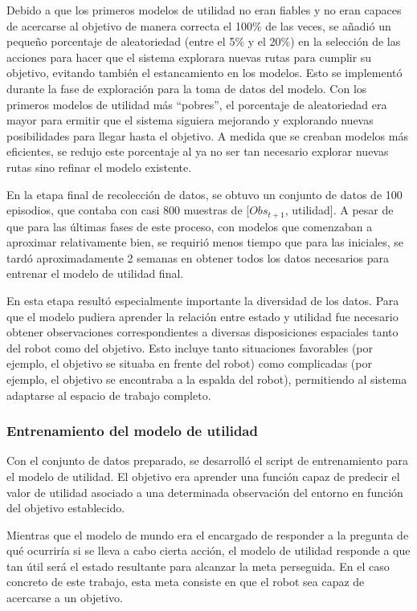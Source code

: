 Debido a que los primeros modelos de utilidad no eran fiables y no eran capaces de acercarse al objetivo de manera correcta el 100\% de las veces, se añadió un pequeño porcentaje de 
aleatoriedad (entre el 5\% y el 20\%) en la selección de las acciones para hacer que el sistema explorara nuevas rutas para cumplir su objetivo, evitando también el estancamiento en los 
modelos. Esto se implementó durante la fase de exploración para la toma de datos del modelo. Con los primeros modelos de utilidad más “pobres”, el porcentaje de aleatoriedad era mayor para 
ermitir que el sistema siguiera mejorando y explorando nuevas posibilidades para llegar hasta el objetivo. A medida que se creaban modelos más eficientes, se redujo este porcentaje al ya no ser 
tan necesario explorar nuevas rutas sino refinar el modelo existente.

En la etapa final de recolección de datos, se obtuvo un conjunto de datos de 100 episodios, que contaba con casi 800 muestras de [\( Obs_{t+1} \), utilidad]. A pesar de que para las últimas 
fases de este proceso, con modelos que comenzaban a aproximar relativamente bien, se requirió menos tiempo que para las iniciales, se tardó aproximadamente 2 semanas en obtener todos los datos 
necesarios para entrenar el modelo de utilidad final.

En esta etapa resultó especialmente importante la diversidad de los datos. Para que el modelo pudiera aprender la relación entre estado y utilidad fue necesario obtener observaciones 
correspondientes a diversas disposiciones espaciales tanto del robot como del objetivo. Esto incluye tanto situaciones favorables (por ejemplo, el objetivo se situaba en frente del robot) como 
complicadas (por ejemplo, el objetivo se encontraba a la espalda del robot), permitiendo al sistema adaptarse al espacio de trabajo completo.


\subsubsection{Entrenamiento del modelo de utilidad}

Con el conjunto de datos preparado, se desarrolló el \gls{script} de entrenamiento para el modelo de utilidad. El objetivo era aprender una función capaz de predecir el valor de utilidad 
asociado a una determinada observación del entorno en función del objetivo establecido.

Mientras que el modelo de mundo era el encargado de responder a la pregunta de qué ocurriría si se lleva a cabo cierta acción, el modelo de utilidad responde a que tan útil será el estado 
resultante para alcanzar la meta perseguida. En el caso concreto de este trabajo, esta meta consiste en que el robot sea capaz de acercarse a un objetivo.

